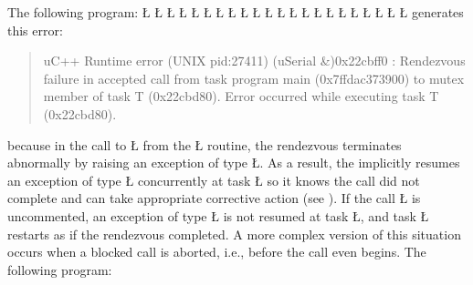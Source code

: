 \documentclass[openright,twoside]{report}
\begin{document}
The following program:
\LGinlinefalse\LGbegin\lgrinde
\L{}
\L{\LB{}}
\L{}
\L{\LB{}}
\L{}
\L{\LB{}}
\L{\LB{}}
\L{\LB{\C{}\1\1}}
\CE{}\L{\LB{}}
\L{\LB{}}
\L{}
\L{\LB{}}
\L{\LB{}}
\L{\LB{}}
\L{\LB{\};}}
\endlgrinde\LGend
\LGinlinefalse\LGbegin\lgrinde
\L{}
\L{\LB{}}
\L{\LB{}}
\L{\LB{}}
\L{\LB{}}
\L{\LB{}}
\L{\LB{\}}}
\endlgrinde\LGend
generates this error:
\begin{quote}
\BGfont
uC++ Runtime error (UNIX pid:27411) (uSerial \&)0x22cbff0 : Rendezvous failure in accepted call from task program main (0x7ffdac373900) to mutex member of task T (0x22cbd80).
Error occurred while executing task T (0x22cbd80).
\end{quote}
\noindent
\begin{sloppypar}
because in the call to \LGinlinetrue\LGbegin\lgrinde\L{}\endlgrinde\LGend{} from the \LGinlinetrue\LGbegin\lgrinde\L{}\endlgrinde\LGend{} routine, the rendezvous terminates abnormally by raising an exception of type \LGinlinetrue\LGbegin\lgrinde\L{}\endlgrinde\LGend{}.
As a result, the  implicitly resumes an exception of type \LGinlinetrue\LGbegin\lgrinde\L{}\endlgrinde\LGend{} concurrently at task \LGinlinetrue\LGbegin\lgrinde\L{}\endlgrinde\LGend{} so it knows the call did not complete and can take appropriate corrective action (see ).
If the call \LGinlinetrue\LGbegin\lgrinde\L{}\endlgrinde\LGend{} is uncommented, an exception of type \LGinlinetrue\LGbegin\lgrinde\L{}\endlgrinde\LGend{} is not resumed at task \LGinlinetrue\LGbegin\lgrinde\L{}\endlgrinde\LGend{}, and task \LGinlinetrue\LGbegin\lgrinde\L{}\endlgrinde\LGend{} restarts as if the rendezvous completed.
A more complex version of this situation occurs when a blocked call is aborted, i.e., before the call even begins.
The following program:
\end{sloppypar}
\end{document}
